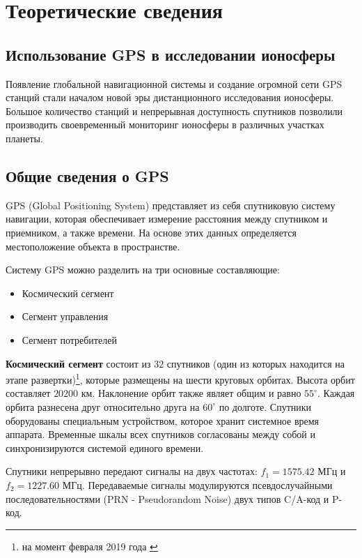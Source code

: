 \documentclass[a4paper]{article}
\begin{document}
\newpage
\section{Теоретические сведения}
\subsection{Использование GPS в исследовании ионосферы}
Появление глобальной навигационной системы и создание огромной сети GPS станций стали началом новой эры дистанционного исследования ионосферы. Большое количество станций и непрерывная доступность спутников позволили производить своевременный мониторинг ионосферы в различных участках планеты. 

\newpage
\subsection{Общие сведения о GPS}
GPS (Global Positioning System) представляет из себя спутниковую систему навигации, которая обеспечивает измерение расстояния между спутником и приемником, а также времени. На основе этих данных определяется местоположение объекта в пространстве.

Систему GPS можно разделить на три основные составляющие:
\begin{itemize}
\item Космический сегмент
\item Сегмент управления
\item Сегмент потребителей
\end{itemize}

\textbf{Космический сегмент} состоит из $32$ спутников (один из которых находится на этапе развертки)\footnote{на момент февраля 2019 года \cite{gpsgov}}, которые размещены на шести круговых орбитах. Высота орбит составляет $20200$ км. Наклонение орбит также являет общим и равно $55^{\circ}$. Каждая орбита разнесена друг относительно друга на $60^{\circ}$ по долготе. Спутники оборудованы специальным устройством, которое хранит системное время аппарата. Временные шкалы всех спутников согласованы между собой и синхронизируются системой единого времени.

Спутники непрерывно передают сигналы на двух частотах: $f_1 = 1575.42 \text{ МГц}$ и $f_2 = 1227.60 \text{ МГц}$. Передаваемые сигналы модулируются псевдослучайными последовательностями (PRN - Pseudorandom Noise) двух типов C/A-код и P-код.
\end{document}
